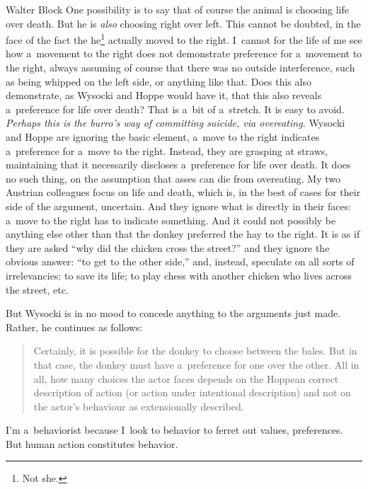 \begin{artengenv}{Walter Block}
One possibility is to say that of course the animal is choosing life over death. But he is \textit{also} choosing right over left. This cannot be doubted, in the face of the fact the he\footnote{Not she.} actually moved to the right. I~cannot for the life of me see how a~movement to the right does not demonstrate preference for a~movement to the right, always assuming of course that there was no outside interference, such as being whipped on the left side, or anything like that. Does this also demonstrate, as Wysocki and Hoppe would have it, that this also reveals a~preference for life over death? That is a~bit of a~stretch. It is easy to avoid. \textit{Perhaps this is the burro's way of committing suicide, via overeating.} Wysocki and Hoppe are ignoring the basic element, a~move to the right indicates a~preference for a~move to the right. Instead, they are grasping at straws, maintaining that it necessarily discloses a~preference for life over death. It does no such thing, on the assumption that asses can die from overeating. My two Austrian colleagues focus on life and death, which is, in the best of cases for their side of the argument, uncertain. And they ignore what is directly in their faces: a~move to the right has to indicate something. And it could not possibly be anything else other than that the donkey preferred the hay to the right. It is as if they are asked ``why did the chicken cross the street?'' and they ignore the obvious answer: ``to get to the other side,'' and, instead, speculate on all sorts of irrelevancies: to save its life; to play chess with another chicken who lives across the street, etc.



But Wysocki is in no mood to concede anything to the arguments just made. Rather, he continues as follows:



\begin{quote}
Certainly, it is possible for the donkey to choose between the bales. But in that case, the donkey must have a~preference for one over the other. All in all, how many choices the actor faces depends on the Hoppean 
\parencite*[][]{hoppe_must_2005} %
 correct description of action (or action under intentional description) and not on the actor's behaviour as extensionally described.
\end{quote}



I'm a~behaviorist because I~look to behavior to ferret out values, preferences. But human action constitutes behavior.




\end{artengenv}
